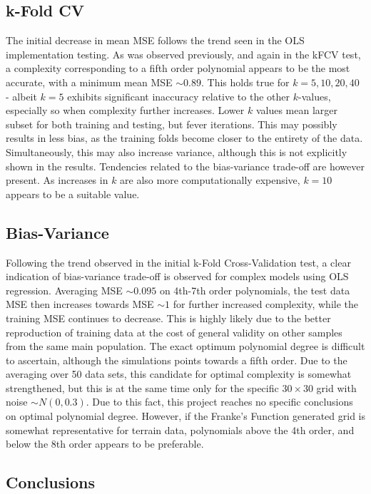 \documentclass[%
oneside,                 %
final,                   %
10pt]{article}
\begin{document}
\subsection{k-Fold CV}
The initial decrease in mean MSE follows the trend seen in the OLS implementation testing.  As was observed previously, and again in the kFCV test, a complexity corresponding to a fifth order polynomial appears to be the most accurate, with a minimum mean MSE $\sim 0.89$. This holds true for $k=5,10,20,40$ - albeit $k=5$ exhibits significant inaccuracy relative to the other $k$-values, especially so when complexity further increases. Lower $k$ values mean larger subset for both training and testing, but fever iterations. This may possibly results in less bias, as the training folds become closer to the entirety of the data. Simultaneously, this may also increase variance, although this is not explicitly shown in the results. Tendencies related to the bias-variance trade-off are however present. As increases in $k$ are also more computationally expensive, $k=10$ appears to be a suitable value.

\subsection{Bias-Variance}
Following the trend observed in the initial k-Fold Cross-Validation test, a clear indication of bias-variance trade-off is observed for complex models using OLS regression. Averaging MSE $\sim 0.095$ on 4th-7th order polynomials, the test data MSE then increases towards MSE $\sim 1$ for further increased complexity, while the training MSE continues to decrease. This is highly likely due to the better reproduction of training data at the cost of general validity on other samples from the same main population. The exact optimum polynomial degree is difficult to ascertain, although the simulations points towards a fifth order. Due to the averaging over 50 data sets, this candidate for optimal complexity is somewhat strengthened, but this is at the same time only for the specific $30 \times 30$ grid with noise $\sim N(0,0.3)$. Due to this fact, this project reaches no specific conclusions on optimal polynomial degree. However, if the Franke's Function generated grid is somewhat representative for terrain data, polynomials above the 4th order, and below the 8th order appears to be preferable.


\subsection{Conclusions}
\end{document}
